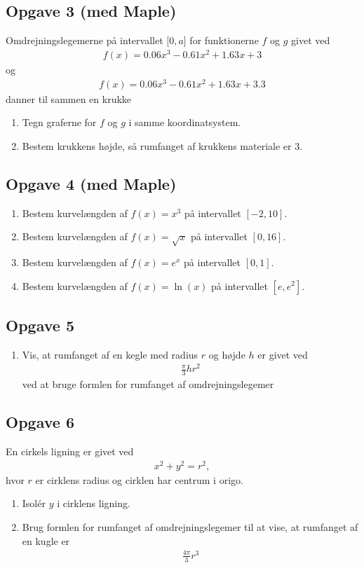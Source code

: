 \subsection*{Opgave 3 (med Maple)}
Omdrejningslegemerne på intervallet $[0,a$] for funktionerne $f$ og $g$ givet ved
\begin{align*}
	f(x) = 0.06x^3 - 0.61x^2 + 1.63x + 3
\end{align*}
og
\begin{align*}
	f(x) = 0.06x^3 - 0.61x^2 + 1.63x + 3.3
\end{align*}
danner til sammen en krukke
\begin{enumerate}[label=\roman*)]
	\item Tegn graferne for $f$ og $g$ i samme koordinatsystem.
	\item Bestem krukkens højde, så rumfanget af krukkens materiale er 3.
\end{enumerate}

\subsection*{Opgave 4 (med Maple)}
\begin{enumerate}[label=\roman*)]
	\item Bestem kurvelængden af $f(x) = x^3$ på intervallet $[-2,10]$.
	\item Bestem kurvelængden af $f(x) = \sqrt{x}$ på intervallet $[0,16]$.
	\item Bestem kurvelængden af $f(x) = e^x$ på intervallet $[0,1]$.
	\item Bestem kurvelængden af $f(x) = \ln(x)$ på intervallet $[e,e^2]$.
\end{enumerate}

\subsection*{Opgave 5}
\begin{enumerate}[label=\roman*)]
	\item Vis, at rumfanget af en kegle med radius $r$ og højde $h$ er givet ved
	\begin{align*}
		\frac{\pi}{3}hr^2
	\end{align*}
	ved at bruge formlen for rumfanget af omdrejningslegemer
\end{enumerate}
\subsection*{Opgave 6}
En cirkels ligning er givet ved 
\begin{align*}
	x^2 + y^2 = r^2,
\end{align*}
hvor $r$ er cirklens radius og cirklen har centrum i origo. 
\begin{enumerate}[label=\roman*)]
	\item Isolér $y$ i cirklens ligning. 
	\item Brug formlen for rumfanget af omdrejningslegemer til at vise, at rumfanget af en kugle er
	\begin{align*}
		\frac{4\pi}{3}r^3
	\end{align*}
\end{enumerate}